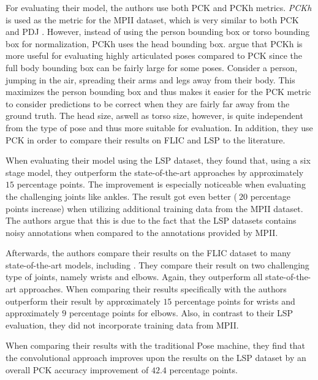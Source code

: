 For evaluating their model, the authors use both PCK  and PCKh metrics.
\textit{PCKh} is used as the metric for the MPII dataset, which is very similar to both PCK and PDJ .
However, instead of using the person bounding box or torso bounding box for normalization, PCKh uses the head bounding box.
\cite{andriluka_2d_2014} argue that PCKh is more useful for evaluating highly articulated poses compared to PCK since the full body bounding box can be fairly large for some poses.
Consider a person, jumping in the air, spreading their arms and legs away from their body.
This maximizes the person bounding box and thus makes it easier for the PCK metric to consider predictions to be correct when they are fairly far away from the ground truth.
The head size, aswell as torso size, however, is quite independent from the type of pose and thus more suitable for evaluation.
In addition, they use PCK in order to compare their results on FLIC and LSP to the literature.

When evaluating their model using the LSP dataset, they found that, using a six stage model, they outperform the state-of-the-art approaches by approximately $15$ percentage points.
The improvement is especially noticeable when evaluating the challenging joints like ankles.
The result got even better ($~20$ percentage points increase) when utilizing additional training data from the MPII dataset.
The authors argue that this is due to the fact that the LSP datasets contains noisy annotations when compared to the annotations provided by MPII.

Afterwards, the authors compare their results on the FLIC dataset to many state-of-the-art models, including \cite{toshev_deeppose:_2014} .
They compare their result on two challenging type of joints, namely wrists and elbows.
Again, they outperform all state-of-the-art approaches.
When comparing their results specifically with \cite{toshev_deeppose:_2014} the authors outperform their result by approximately $15$ percentage points for wrists and approximately $9$ percentage points for elbows.
Also, in contrast to their LSP evaluation, they did not incorporate training data from MPII.

When comparing their results with the traditional Pose machine, they find that the convolutional approach improves upon the results on the LSP dataset by an overall PCK accuracy improvement of $42.4$ percentage points.


